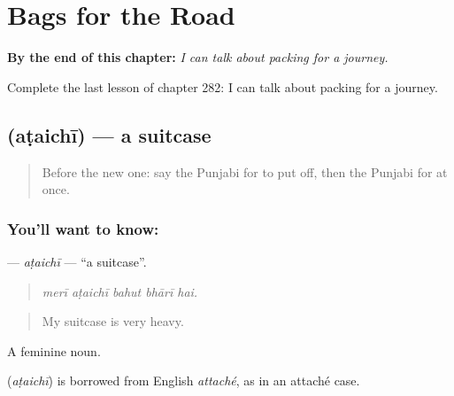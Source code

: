 
\chapter{Bags for the Road}
\label{ch:pa-a2-bags-for-the-road}

\begin{chapteropening}
\textbf{By the end of this chapter:} \emph{I can talk about packing for a journey.}

Complete the last lesson of chapter 282: I can talk about packing for a journey.
\end{chapteropening}

\section[\texorpdfstring{\pa{ਅਟੈਚੀ} (aṭaichī)}{ਅਟੈਚੀ (aṭaichī)}]{ (aṭaichī) — a suitcase}

\label{lesson:PA-C282-ataichi}



\begin{quote}
Before the new one: say the Punjabi for to put off, then the Punjabi for at once.
\end{quote}

\subsection*{You'll want to know: }
\textbf{} — \emph{aṭaichī} — \textquotedblleft{}a suitcase\textquotedblright{}.

\begin{quote}
    
\end{quote}

\begin{quote}
\emph{merī aṭaichī bahut bhārī hai.}
\end{quote}

\begin{quote}
My suitcase is very heavy.
\end{quote}

A feminine noun.

\begin{cousinweb}
\textbf{} (\emph{aṭaichī}) is borrowed from English \emph{attaché}, as in an attaché case.
\end{cousinweb}

